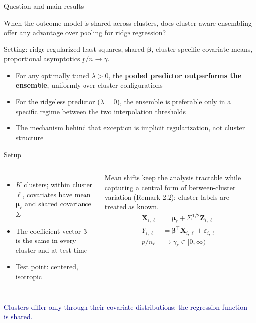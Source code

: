 \documentclass[aspectratio=169,11pt]{beamer}
\newcommand{\takeaway}[1]{%
  \vfill
  {\centering\colorbox{navy!8}{\parbox{0.92\textwidth}{\centering\small\textcolor{navy}{#1}}}\par}}
\newcommand{\bbeta}{\bm{\beta}}
\newcommand{\bmu}{\bm{\mu}}
\begin{document}
\begin{frame}{Question and main results}
  \begin{block}{}
    \centering When the outcome model is shared across clusters, does cluster-aware ensembling\\ offer any advantage over pooling for ridge regression?
  \end{block}
  \vspace{3mm}
  Setting: ridge-regularized least squares, shared $\bbeta$, cluster-specific covariate means, proportional asymptotics $p/n \to \gamma$.
  \vspace{2mm}
  \begin{itemize}
    \item<2-> For any optimally tuned $\lambda > 0$, the \textcolor{poolblue}{\textbf{pooled predictor outperforms the ensemble}}, uniformly over cluster configurations
    \item<2-> For the ridgeless predictor ($\lambda = 0$), the ensemble is preferable only in a specific regime between the two interpolation thresholds
    \item<2-> The mechanism behind that exception is implicit regularization, not cluster structure
  \end{itemize}
\end{frame}

\begin{frame}{Setup}
  \begin{columns}[T]
    \begin{itemize}
      \item $K$ clusters; within cluster $\ell$, covariates have mean $\bmu_\ell$ and shared covariance $\Sigma$
      \item The coefficient vector $\bbeta$ is the same in every cluster and at test time
      \item Test point: centered, isotropic
    \end{itemize}
    \vspace{2mm}
    {\small\textcolor{softgray}{Mean shifts keep the analysis tractable while capturing a central form of between-cluster variation (Remark 2.2); cluster labels are treated as known.}}
    \begin{align*}
      \bm{X}_{i,\ell} &= \bmu_\ell + \Sigma^{1/2}\bm{Z}_{i,\ell}\\[1mm]
      Y_{i,\ell} &= \bbeta^\top \bm{X}_{i,\ell} + \varepsilon_{i,\ell}\\[1mm]
      p/n_\ell &\to \gamma_\ell \in [0,\infty)
    \end{align*}
  \end{columns}
  \takeaway{Clusters differ only through their covariate distributions; the regression function is shared.}
\end{frame}
\end{document}
